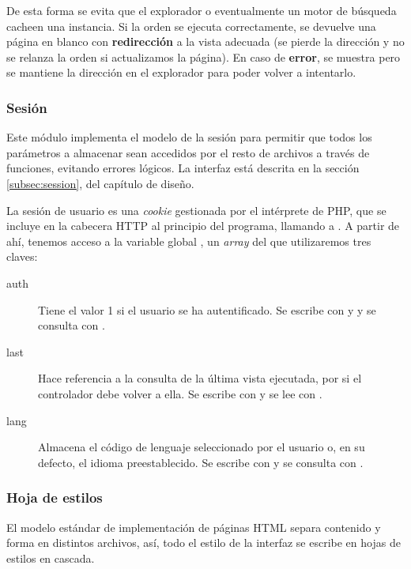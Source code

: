 De esta forma se evita que el explorador o eventualmente un motor de búsqueda cacheen una instancia. Si la orden se ejecuta correctamente, se devuelve una página en blanco con \textbf{redirección} a la vista adecuada (se pierde la dirección y no se relanza la orden si actualizamos la página). En caso de \textbf{error}, se muestra pero se mantiene la dirección en el explorador para poder volver a intentarlo.

\subsubsection{Sesión}

Este módulo implementa el modelo de la sesión para permitir que todos los parámetros a almacenar sean accedidos por el resto de archivos a través de funciones, evitando errores lógicos. La interfaz está descrita en la sección \ref{subsec:session}, del capítulo de diseño.

La sesión de usuario es una \textit{cookie} gestionada por el intérprete de PHP, que se incluye en la cabecera \acrshort{HTTP} al principio del programa, llamando a . A partir de ahí, tenemos acceso a la variable global , un \textit{array} del que utilizaremos tres claves:

\begin{description}
	\item[auth] Tiene el valor 1 si el usuario se ha autentificado. Se escribe con  y  y se consulta con .
	
	\item[last] Hace referencia a la consulta de la última vista ejecutada, por si el controlador debe volver a ella. Se escribe con  y se lee con .
	
	\item[lang] Almacena el código de lenguaje seleccionado por el usuario o, en su defecto, el idioma preestablecido. Se escribe con  y se consulta con .
\end{description}

\subsubsection{Hoja de estilos}

El modelo estándar de implementación de páginas \acrshort{HTML} separa contenido y forma en distintos archivos, así, todo el estilo de la interfaz se escribe en hojas de estilos en cascada.

